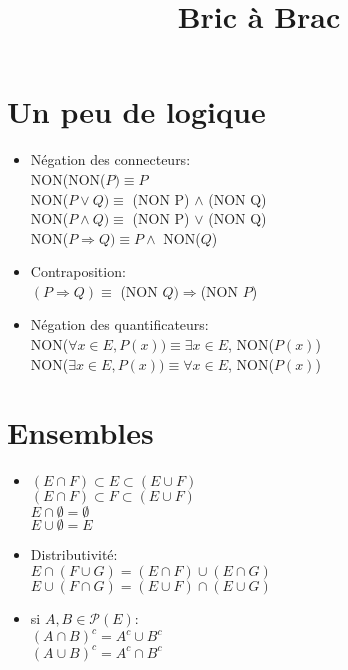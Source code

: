 \documentclass[fleqn]{article}
\title{Bric \`a Brac}
\date{}
\begin{document}
\maketitle

\section{Un peu de logique}
\begin{itemize}
	\item N\'egation des connecteurs: \\
		NON(NON(\(P) \equiv  P\) \\
		NON(\(P \lor Q) \equiv \) (NON P) \(\land\) (NON Q) \\
		NON(\(P \land Q) \equiv \) (NON P) \(\lor\) (NON Q) \\
		NON(\(P \Rightarrow Q) \equiv P \land\) NON(\(Q\))
	\item Contraposition: \\
		\((P \Rightarrow Q) \equiv\) (NON \(Q)\Rightarrow\)(NON \(P\))
	\item N\'egation des quantificateurs: \\
		NON(\(\forall x \in E, P(x)) \equiv \exists x \in E\), NON(\(P(x)\)) \\
		NON(\(\exists x \in E, P(x)) \equiv \forall x \in E\), NON(\(P(x)\))
\end{itemize}

\section{Ensembles}
\begin{itemize}
	\item $(E \cap F) \subset E \subset (E \cup F)$ \\
		$(E \cap F) \subset F \subset (E \cup F)$ \\
		$E \cap \emptyset = \emptyset$ \\
		$E \cup \emptyset = E$
	\item Distributivit\'e: \\
		\(E \cap(F \cup G) = (E \cap F) \cup (E \cap G)\) \\
		\(E \cup (F \cap G) = (E \cup F) \cap (E \cup G)\)
	\item si \(A, B \in \mathcal{P}(E)\): \\
		\((A \cap B)^c = A^c \cup B^c\) \\
		\((A \cup B)^c = A^c \cap B^c\)
\end{itemize}
\end{document}

